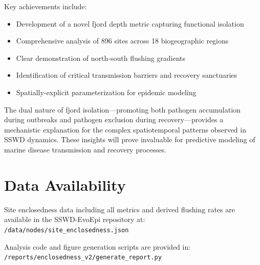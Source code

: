 \documentclass[11pt,a4paper]{article}
\begin{document}
Key achievements include:
\begin{itemize}
    \item Development of a novel fjord depth metric capturing functional isolation
    \item Comprehensive analysis of 896 sites across 18 biogeographic regions
    \item Clear demonstration of north-south flushing gradients
    \item Identification of critical transmission barriers and recovery sanctuaries
    \item Spatially-explicit parameterization for epidemic modeling
\end{itemize}

The dual nature of fjord isolation—promoting both pathogen accumulation during outbreaks and pathogen exclusion during recovery—provides a mechanistic explanation for the complex spatiotemporal patterns observed in SSWD dynamics. These insights will prove invaluable for predictive modeling of marine disease transmission and recovery processes.

\section*{Data Availability}

Site enclosedness data including all metrics and derived flushing rates are available in the SSWD-EvoEpi repository at:
\texttt{/data/nodes/site\_enclosedness.json}

Analysis code and figure generation scripts are provided in:
\texttt{/reports/enclosedness\_v2/generate\_report.py}
\end{document}
